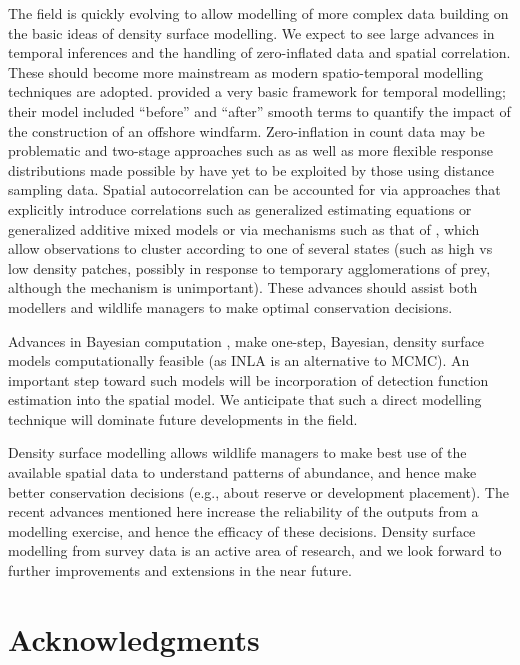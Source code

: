 \documentclass[a4paper,12pt]{article}
\begin{document}
The field is quickly evolving to allow modelling of more complex data building on the basic ideas of density surface modelling. We expect to see large advances in temporal inferences and the handling of zero-inflated data and spatial correlation. These should become more mainstream as modern spatio-temporal modelling techniques are adopted. \cite{Petersen:2011vy} provided a very basic framework for temporal modelling; their model included ``before'' and ``after'' smooth terms to quantify the impact of the construction of an offshore windfarm. Zero-inflation in count data may be problematic and two-stage approaches such as \cite{Barry:2002bm} as well as more flexible response distributions made possible by \cite{Rigby:2005wb} have yet to be exploited by those using distance sampling data. Spatial autocorrelation can be accounted for via approaches that explicitly introduce correlations such as generalized estimating equations \cite[GEEs;][]{Hardin:2003uf} or generalized additive mixed models or via mechanisms such as that of \cite{Skaug:2006gs}, which allow observations to cluster according to one of several states (such as high vs low density patches, possibly in response to temporary agglomerations of prey, although the mechanism is unimportant). These advances should assist both modellers and wildlife managers to make optimal conservation decisions. 

Advances in Bayesian computation \cite[INLA;][]{Rue:2009tw}, make one-step, Bayesian, density surface models computationally feasible (as INLA is an alternative to MCMC). An important step toward such models will be incorporation of detection function estimation into the spatial model. We anticipate that such a direct modelling technique will dominate future developments in the field.

Density surface modelling allows wildlife managers to make best use of the available spatial data to understand patterns of abundance, and hence make better conservation decisions (e.g., about reserve or development placement). The recent advances mentioned here increase the reliability of the outputs from a modelling exercise, and hence the efficacy of these decisions.  Density surface modelling from survey data is an active area of research, and we look forward to further improvements and extensions in the near future.

\section*{Acknowledgments}
\end{document}
